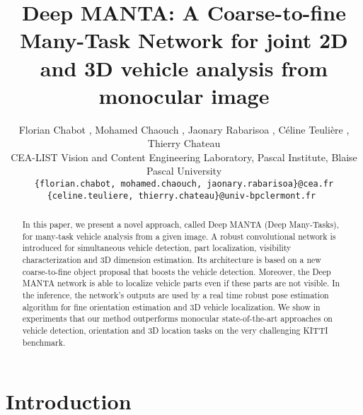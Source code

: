 \documentclass[10pt,twocolumn,letterpaper]{article}
\begin{document}
\title{Deep MANTA: A Coarse-to-fine Many-Task Network for joint 2D and 3D vehicle analysis from monocular image}

\author{Florian Chabot , Mohamed Chaouch , Jaonary Rabarisoa , C\'{e}line Teuli\`{e}re , Thierry Chateau \\
 CEA-LIST Vision and Content Engineering Laboratory,  Pascal Institute, Blaise Pascal University\\
{\tt\small \{florian.chabot, mohamed.chaouch, jaonary.rabarisoa\}@cea.fr} \\
{\tt\small \{celine.teuliere, thierry.chateau\}@univ-bpclermont.fr‎ }
}

\maketitle


\maketitle
\begin{abstract}
In this paper, we present a novel approach, called Deep MANTA (Deep Many-Tasks), for many-task vehicle analysis from a given image. A robust convolutional network is introduced for simultaneous vehicle detection, part localization, visibility characterization and 3D dimension estimation. Its architecture is based on a new coarse-to-fine object proposal that boosts the vehicle detection. Moreover, the Deep MANTA network is able to localize vehicle parts even if these parts are not visible. In the inference, the network's outputs are used by a real time robust pose estimation algorithm for fine orientation estimation and 3D vehicle localization. We show in experiments that our method outperforms monocular state-of-the-art approaches on vehicle detection, orientation and 3D location tasks on the very challenging KITTI benchmark.

\end{abstract}

\section{Introduction}
\label{sec:intro}
\thispagestyle{empty}
\end{document}
